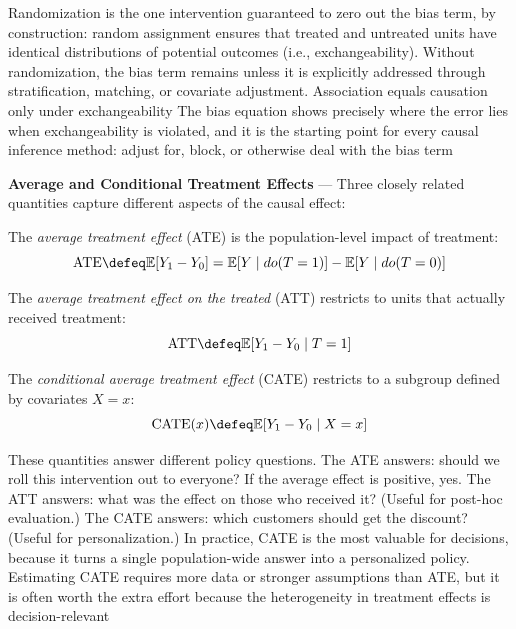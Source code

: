 Randomization is the one intervention guaranteed to zero out the bias term, by construction:
random assignment ensures that treated and untreated units have identical
distributions of potential outcomes (i.e., exchangeability). Without randomization,
the bias term remains unless it is explicitly addressed through stratification, matching,
or covariate adjustment. Association equals causation only under exchangeability
The bias equation shows precisely where the error lies when exchangeability is
violated, and it is the starting point for every causal inference method: adjust
for, block, or otherwise deal with the bias term

\textbf{Average and Conditional Treatment Effects} --- Three closely related
quantities capture different aspects of the causal effect:

The \emph{average treatment effect} (ATE) is the population-level impact of treatment:
\begin{equation}
  \text{ATE}\defeq \mathbb{E}[Y_{1}- Y_{0}] = \mathbb{E}[Y \mid do(T = 1)] - \mathbb{E}
  [Y \mid do(T = 0)] \label{eq:ate}
\end{equation}

The \emph{average treatment effect on the treated} (ATT) restricts to units that
actually received treatment:
\begin{equation}
  \text{ATT}\defeq \mathbb{E}[Y_{1}- Y_{0}\mid T = 1] \label{eq:att}
\end{equation}

The \emph{conditional average treatment effect} (CATE) restricts to a subgroup defined
by covariates $X = x$:
\begin{equation}
  \text{CATE}(x) \defeq \mathbb{E}[Y_{1}- Y_{0}\mid X = x] \label{eq:cate}
\end{equation}

These quantities answer different policy questions. The ATE answers: should we roll
this intervention out to everyone? If the average effect is positive, yes. The
ATT answers: what was the effect on those who received it? (Useful for post-hoc evaluation.)
The CATE answers: which customers should get the discount? (Useful for
personalization.) In practice, CATE is the most valuable for decisions, because
it turns a single population-wide answer into a personalized policy. Estimating CATE
requires more data or stronger assumptions than ATE, but it is often worth the
extra effort because the heterogeneity in treatment effects is decision-relevant

